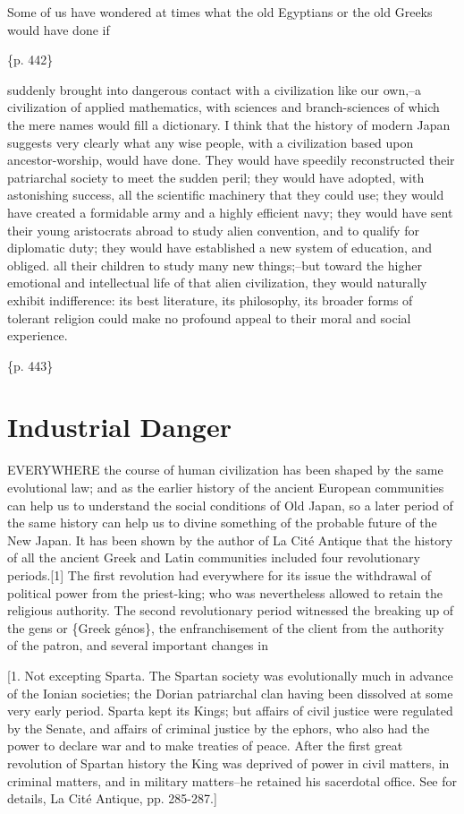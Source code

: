 Some of us have wondered at times what the old Egyptians or the old Greeks would have done if

\{p. 442\}

suddenly brought into dangerous contact with a civilization like our own,--a civilization of applied mathematics, with sciences and branch-sciences of which the mere names would fill a dictionary. I think that the history of modern Japan suggests very clearly what any wise people, with a civilization based upon ancestor-worship, would have done. They would have speedily reconstructed their patriarchal society to meet the sudden peril; they would have adopted, with astonishing success, all the scientific machinery that they could use; they would have created a formidable army and a highly efficient navy; they would have sent their young aristocrats abroad to study alien convention, and to qualify for diplomatic duty; they would have established a new system of education, and obliged. all their children to study many new things;--but toward the higher emotional and intellectual life of that alien civilization, they would naturally exhibit indifference: its best literature, its philosophy, its broader forms of tolerant religion could make no profound appeal to their moral and social experience.

\{p. 443\}

\section{Industrial Danger}
\label{sec:org6ff2f00}

EVERYWHERE the course of human civilization has been shaped by the same evolutional law; and as the earlier history of the ancient European communities can help us to understand the social conditions of Old Japan, so a later period of the same history can help us to divine something of the probable future of the New Japan. It has been shown by the author of La Cité Antique that the history of all the ancient Greek and Latin communities included four revolutionary periods.[1] The first revolution had everywhere for its issue the withdrawal of political power from the priest-king; who was nevertheless allowed to retain the religious authority. The second revolutionary period witnessed the breaking up of the gens or \{Greek génos\}, the enfranchisement of the client from the authority of the patron, and several important changes in

[1. Not excepting Sparta. The Spartan society was evolutionally much in advance of the Ionian societies; the Dorian patriarchal clan having been dissolved at some very early period. Sparta kept its Kings; but affairs of civil justice were regulated by the Senate, and affairs of criminal justice by the ephors, who also had the power to declare war and to make treaties of peace. After the first great revolution of Spartan history the King was deprived of power in civil matters, in criminal matters, and in military matters--he retained his sacerdotal office. See for details, La Cité Antique, pp. 285-287.]

